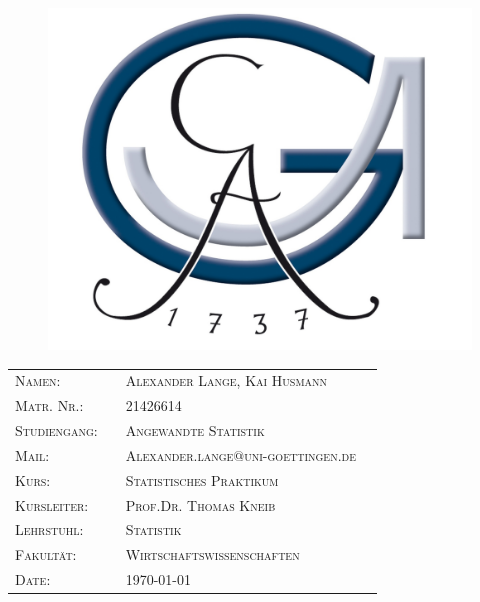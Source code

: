 \documentclass{Vorlage}
\begin{document}

\begin{titlepage}

\begin{figure}
 \begin{center}
 \includegraphics[scale=0.8]{Pictures/logo3}
 \end{center}
\end{figure}
\vspace*{3cm}





\vspace{1cm}

\begin{tabular}{p{3.5cm}|p{0.1cm} p{10cm}l}
\textsc{Namen:} & & \textsc{Alexander Lange, Kai Husmann}\\
\textsc{Matr. Nr.:} & & \textsc{21426614}\\
\textsc{Studiengang:} & & \textsc{Angewandte Statistik}\\
\textsc{Mail:} & & \textsc{Alexander.lange$ @ $uni-goettingen.de}\\
\textsc{Kurs:} & & \textsc{Statistisches Praktikum}\\
\textsc{Kursleiter:} & & \textsc{Prof.Dr. Thomas Kneib}\\
\textsc{Lehrstuhl:} & & \textsc{Statistik}\\
\textsc{Fakultät:} & & \textsc{Wirtschaftswissenschaften}\\
\textsc{Date:} & & \textsc{\today}\\
\end{tabular}
\end{titlepage}
\end{document}
